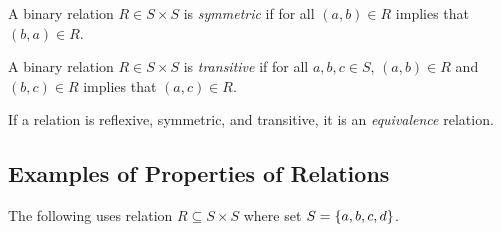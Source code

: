 \begin{definition}
    A binary relation \(R\in S\times S\) is \emph{symmetric} if for all \((a,b)\in R\) implies that \((b,a)\in R\).
\end{definition}

\begin{definition}
    A binary relation \(R\in S\times S\) is \emph{transitive} if for all \(a,b,c\in S\), \((a,b)\in R\) and \((b,c)\in R\) implies that \((a,c)\in R\).
\end{definition}

\begin{definition}
    If a relation is reflexive, symmetric, and transitive, it is an \emph{equivalence} relation. 
\end{definition}

\subsection{Examples of Properties of Relations}

The following uses relation \(R\subseteq S\times S\) where set \(S=\{a,b,c,d\}\).

